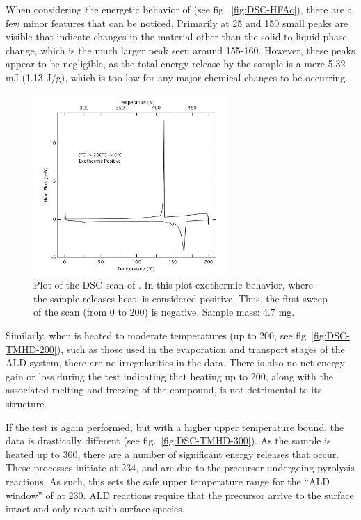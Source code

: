 When considering the energetic behavior of \HFAc{} (see fig.~\vref{fig:DSC-HFAc}), there are a few minor features that can be noticed. Primarily at 25 and 150\degC{} small peaks are visible that indicate changes in the material other than the solid to liquid phase change, which is the much larger peak seen around 155-160\degC{}. However, these peaks appear to be negligible, as the total energy release by the sample is a mere 5.32 mJ (1.13 J/g), which is too low for any major chemical changes to be occurring. 

\begin{figure}[htb]
	\centering
	\includegraphics[width=0.66\textwidth]{./Figures/Data/Thermal-Analysis/DSC/HFAc}
	\caption[DSC Results of \HFAc{}]%
		{Plot of the DSC scan of \HFAc{}. In this plot exothermic behavior, where the sample releases heat, is %
		considered positive. Thus, the first sweep of the scan (from 0\degC{} to 200\degC{}) is negative. %
		Sample mass: 4.7 mg.}
	\label{fig:DSC-HFAc}
\end{figure}

Similarly, when \TMHD{} is heated to moderate temperatures (up to 200\degC{}, see fig~\vref{fig:DSC-TMHD-200}), such as those used in the evaporation and transport stages of the ALD system, there are no irregularities in the data. There is also no net energy gain or loss during the test indicating that heating up to 200\degC{}, along with the associated melting and freezing of the compound, is not detrimental to its structure. 

If the test is again performed, but with a higher upper temperature bound, the data is drastically different (see fig.~\vref{fig:DSC-TMHD-300}). As the sample is heated up to 300\degC{}, there are a number of significant energy releases that occur. These processes initiate at 234\degC{}, and are due to the precursor undergoing pyrolysis reactions. As such, this sets the safe upper temperature range for the ``ALD window'' of \TMHD{} at 230\degC{}. ALD reactions require that the precursor arrive to the surface intact and only react with surface species. 

